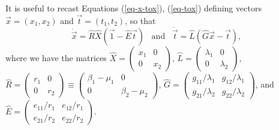 It is useful to recast Equations (\ref{eq-x-tox}), (\ref{eq-tox}) defining vectors $\vec{x}=(x_1,x_2)$ and $\vec{t}=(t_1,t_2)$, so that
\begin{equation}
\dot{\vec{x}} = \hat{R} \hat{X} \left( \vec{1} - \hat{E} \vec{t} \right)\;\;\;\text{and}\;\;\;
\dot{\vec{t}} = \hat{L} \left( \hat{G} \vec{x} - \vec{t} \right), \label{xdot-tdot-eqn}
\end{equation}
where we have the matrices $\hat{X} = \begin{pmatrix}
x_1 & 0 \\
0 & x_2
\end{pmatrix}$, $\hat{L} = \begin{pmatrix}
\lambda_1 & 0 \\
0 & \lambda_2
\end{pmatrix}$, $\hat{R} = \begin{pmatrix}
r_1 & 0 \\
0 & r_2
\end{pmatrix} \equiv \begin{pmatrix}
\beta_1-\mu_1 & 0 \\
0 & \beta_2-\mu_2
\end{pmatrix}$, $\hat{G} = \begin{pmatrix}
g_{11}/\lambda_1 & g_{12}/\lambda_1 \\
g_{21}/\lambda_2 & g_{22}/\lambda_2
\end{pmatrix}$, and $\hat{E} = \begin{pmatrix}
e_{11}/r_1 & e_{12}/r_1 \\
e_{21}/r_2 & e_{22}/r_2
\end{pmatrix}$.

